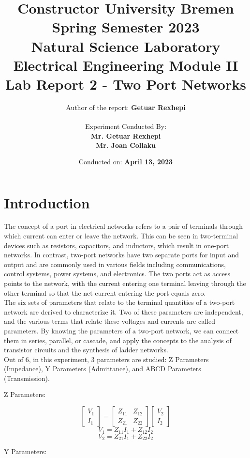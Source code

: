 \documentclass[12pt]{report}
\title{
    \textbf{Constructor University Bremen} \\
Spring Semester 2023 \\
\vspace{1cm}
\textbf{Natural Science Laboratory\\
Electrical Engineering Module II\\}
    \vspace{1cm}
    \textbf{Lab Report 2 - Two Port Networks} \\ 
    
}
\author{
    Author of the report: \textbf{Getuar Rexhepi} \\
    \vspace{1cm} \\
    Experiment Conducted By: \\ \textbf{Mr. Getuar Rexhepi} \\
\textbf{Mr. Joan Collaku}
}
\date{Conducted on: \textbf{April 13, 2023}}
\begin{document}
\maketitle 

\chapter{Introduction}
The concept of a port in electrical networks refers to a pair of terminals through which current can enter or leave the network. This can be seen in two-terminal devices such as resistors, capacitors, and inductors, which result in one-port networks. In contrast, two-port networks have two separate ports for input and output and are commonly used in various fields including communications, control systems, power systems, and electronics. The two ports act as access points to the network, with the current entering one terminal leaving through the other terminal so that the net current entering the port equals zero.\\
The six sets of parameters that relate to the terminal quantities of a two-port network are derived to characterize it. Two of these parameters are independent, and the various terms that relate these voltages and currents are called parameters. By knowing the parameters of a two-port network, we can connect them in series, parallel, or cascade, and apply the concepts to the analysis of transistor circuits and the synthesis of ladder networks.\\
Out of 6, in this experiment, 3 parameters are studied: Z Parameters (Impedance), Y Parameters (Admittance), and ABCD Parameters (Transmission).
\begin{center}
\large Z Parameters:\\
\end{center}
\begin{equation}
\begin{bmatrix}
V_1 \\ I_1
\end{bmatrix}
=
\begin{bmatrix}
Z_{11} & Z_{12} \\
Z_{21} & Z_{22}
\end{bmatrix}
\begin{bmatrix}
V_2 \\ I_2
\end{bmatrix}
\end{equation}
$$ V_1 = Z_{11}I_1 + Z_{12}I_2 $$ 
$$ V_2 = Z_{21}I_1 + Z_{22}I_2 $$
\begin{center}
\large Y Parameters:\\
\end{center}
\end{document}
